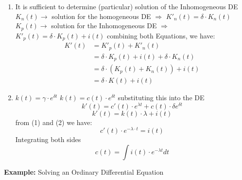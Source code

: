 \documentclass{article}
\begin{document}
\begin{enumerate}
    \item It is sufficient to determine (particular) solution of the Inhomogeneous DE \newline
    $K_n(t) \rightarrow$ solution for the homogeneous DE $\Rightarrow$ $K'_n (t) = \delta \cdot K_n (t)$ 
    \newline
    $K_p(t) \rightarrow$ solution for the Inhomogeneous DE $\Rightarrow$ $K'_p(t) = \delta \cdot K_p (t) + i(t)$
    \newline combining both Equations, we have: \newline
    \begin{equation*}
    \begin{split} 
    K'(t) & = K'_p(t)+K'_n(t) \\
          & = \delta \cdot K_p(t) + i(t) + \delta \cdot K_n(t) \\
          & = \delta \cdot \left(K_p(t)+K_n(t)\right) + i(t) \\
          & = \delta \cdot K(t) + i(t)
    \end{split} 
    \end{equation*}
    \item {} \newline
    $k(t) = \gamma \cdot e^{\delta t}$ \newline
    $k(t) = c(t) \cdot e^{\delta t}$ \newline
    substituting this into the DE  \\[1mm]
    \begin{equation} k'(t) = c'(t) \cdot e^{\lambda t} + c(t) \cdot \delta e^{\delta t} \end{equation}
    \begin{equation} k'(t) = k(t) \cdot \lambda + i(t) \end{equation} 
    from (1) and (2) we have:
    \begin{equation*} c'(t) \cdot e^{-\lambda \cdot t} = i(t) \end{equation*} \newline
    Integrating both sides 
    \hspace*{30mm} \begin{equation*}c(t) = \int {i(t) \cdot e^{-\lambda t}dt} \end{equation*}
    \vspace{5mm}
\end{enumerate}
\textbf{Example:} Solving an Ordinary Differential Equation
\end{document}
